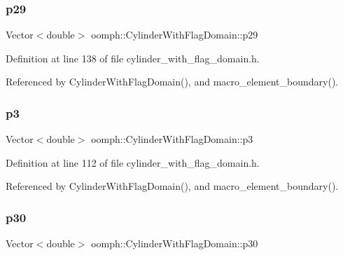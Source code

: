 \subsubsection{\texorpdfstring{p29}{p29}}
{\footnotesize\ttfamily Vector$<$double$>$ oomph\+::\+Cylinder\+With\+Flag\+Domain\+::p29\hspace{0.3cm}{\ttfamily [private]}}



Definition at line 138 of file cylinder\+\_\+with\+\_\+flag\+\_\+domain.\+h.



Referenced by Cylinder\+With\+Flag\+Domain(), and macro\+\_\+element\+\_\+boundary().

\mbox{\label{classoomph_1_1CylinderWithFlagDomain_a6327976b3d8e582cfc232be01c45d975}} 
\subsubsection{\texorpdfstring{p3}{p3}}
{\footnotesize\ttfamily Vector$<$double$>$ oomph\+::\+Cylinder\+With\+Flag\+Domain\+::p3\hspace{0.3cm}{\ttfamily [private]}}



Definition at line 112 of file cylinder\+\_\+with\+\_\+flag\+\_\+domain.\+h.



Referenced by Cylinder\+With\+Flag\+Domain(), and macro\+\_\+element\+\_\+boundary().

\mbox{\label{classoomph_1_1CylinderWithFlagDomain_af35a25c3f63e71f2bff61b1da3384630}} 
\subsubsection{\texorpdfstring{p30}{p30}}
{\footnotesize\ttfamily Vector$<$double$>$ oomph\+::\+Cylinder\+With\+Flag\+Domain\+::p30\hspace{0.3cm}{\ttfamily [private]}}



